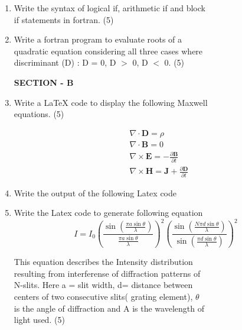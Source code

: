 \documentclass{book}
\begin{document}
\begin{enumerate}
\item Write the syntax of logical if, arithmetic if and block \\
if statements in fortran. \hfill (5)

\item Write a fortran program to evaluate roots of a \\
quadratic equation considering all three cases where \\
discriminant (D) : D = 0, D $>$ 0, D $<$ 0. \hfill (5)

\vspace{1em}
\begin{center} \textbf{SECTION - B} \end{center}

\item Write a LaTeX code to display the following Maxwell \\ equations. \hfill (5)

    \begin{align*}
        &\nabla \cdot \mathbf{D} = {\rho}\\
        &\nabla \cdot \mathbf{B} = 0  \\
        &\nabla \times \mathbf{E} =-\frac{\partial \mathbf{B}}{\partial t}\\
        &\nabla \times \mathbf{H} =\mathbf{J}+ \frac{\partial \mathbf{D} }{\partial t}
    \end{align*}

\item Write the output of the following Latex code

{\fontsize{8.88}{1pt}\selectfont{
\begin{verbatim}
\[\scalebox{3} {$ I=I_{0} \left(e^{\frac {e V} {\eta K
T}}-1\right)$} \]                                  (5)
\end{verbatim}
}}


\item Write the Latex code to generate following equation
$$
I = I_0
    \left(
        \frac{\sin\left( \frac{\pi a \sin\theta}{\lambda}\right)}{\frac{\pi a \sin\theta}{\lambda}}
    \right)^2
    \left(
        \frac{\sin\left( \frac{N\pi d \sin\theta}{\lambda}\right)}{\sin\left(\frac{\pi d \sin\theta}{\lambda}\right)}
    \right)^2
$$

This equation describes the Intensity distribution \\
resulting from interferense of diffraction patterns of \\
N-slits. Here a = slit width, d= distance between \\
centers of two consecutive slits( grating element), $\theta$ \\
is the angle of diffraction and A is the wavelength of \\
light used. \hfill (5)




\end{enumerate}
\end{document}
